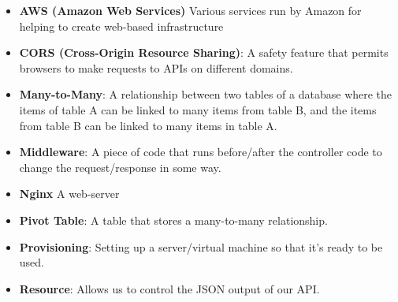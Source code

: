 \begin{itemize}[leftmargin=*]
    \item
        \textbf{AWS (Amazon Web Services)}
        Various services run by Amazon for helping to create web-based infrastructure
    \item
        \textbf{CORS (Cross-Origin Resource Sharing)}:
        A safety feature that permits browsers to make requests to APIs on different domains.
    \item
        \textbf{Many-to-Many}:
        A relationship between two tables of a database where the items of table A can be linked to many items from table B, and the items from table B can be linked to many items in table A.
    \item
        \textbf{Middleware}:
        A piece of code that runs before/after the controller code to change the request/response in some way.
    \item
        \textbf{Nginx}
        A web-server
    \item
        \textbf{Pivot Table}:
        A table that stores a many-to-many relationship.
    \item
        \textbf{Provisioning}:
        Setting up a server/virtual machine so that it's ready to be used.
    \item
        \textbf{Resource}:
        Allows us to control the JSON output of our API.
\end{itemize}
